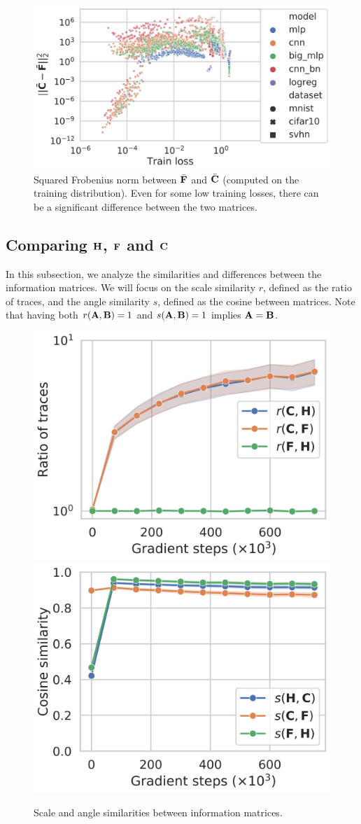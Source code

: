 \begin{figure}[ht]
  \centering
    \includegraphics[width=\textwidth]{articles/hfc/FC_train_l2.png}
    \caption{Squared Frobenius norm between $\bar{{\mathbf{F}}}$ and $\bar{{\mathbf{C}}}$ (computed on the training distribution). Even for some low training losses, there can be a significant difference between the two matrices.
    \label{fig:F_vs_C}}
\end{figure}


\subsection{Comparing \texorpdfstring{${\mathbf{H}}$}{H}, \texorpdfstring{${\mathbf{F}}$}{F} and \texorpdfstring{${\mathbf{C}}$}{C}}

\label{sec:HFC_diff}

In this subsection, we analyze the similarities and differences between the information matrices. We will focus on the scale similarity $r$, defined as the ratio of traces, and the angle similarity $s$, defined as the cosine between matrices.
Note that having both $r({\mathbf{A}}, {\mathbf{B}}) = 1$ and $s({\mathbf{A}}, {\mathbf{B}}) = 1$ implies ${\mathbf{A}} = {\mathbf{B}}$.

\begin{figure}[ht]

    \includegraphics[width=.46\textwidth]{articles/hfc/ratio_trace_HFC_te.png}
      \hfill
    \includegraphics[width=.46\textwidth]{articles/hfc/cossimHFC_te.png}
    \caption{Scale and angle similarities between information matrices.
        \label{fig:similarities}}
\end{figure}

